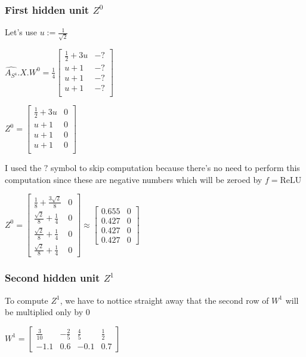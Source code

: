 \documentclass[a4paper]{article}
\begin{document}
\subsubsection*{First hidden unit $Z^{0}$}

Let's use $u := \frac{1}{\sqrt{2}}$

$\hat{A_{S^4}}.X. W^{0} = \frac{1}{4}\begin{bmatrix}
    \frac{1}{2} + 3u &  -? \\
    u+1 &  -? \\
    u+1 &  -? \\
    u+1 &  -? \\
\end{bmatrix}$

$Z^{0} = \begin{bmatrix}
    \frac{1}{2} + 3u & 0 \\
    u+1 &  0 \\
    u+1 &  0 \\
    u+1 &  0 \\
\end{bmatrix}
$


I used the $?$ symbol to skip computation because there's no need to perform this computation since these are negative numbers
which will be zeroed by $f=\text{ReLU}$


$Z^{0} = \left[\begin{matrix}\frac{1}{8} + \frac{3 \sqrt{2}}{8} & 0\\\frac{\sqrt{2}}{8} + \frac{1}{4} & 0\\\frac{\sqrt{2}}{8} + \frac{1}{4} & 0\\\frac{\sqrt{2}}{8} + \frac{1}{4} & 0\end{matrix}\right]
\approx \begin{bmatrix}
    0.655 &  0\\
    0.427 &  0\\
    0.427 &  0\\
    0.427 &  0
  \end{bmatrix}
$

\subsubsection*{Second hidden unit $Z^{1}$}
To compute $Z^{1}$, we have to nottice straight away that the second row of $W^{1}$ will be multiplied only by $0$

$W^{1} = \left[\begin{matrix}\frac{3}{10} & - \frac{2}{5} & \frac{4}{5} & \frac{1}{2}\\-1.1 & 0.6 & -0.1 & 0.7\end{matrix}\right]$
\end{document}
